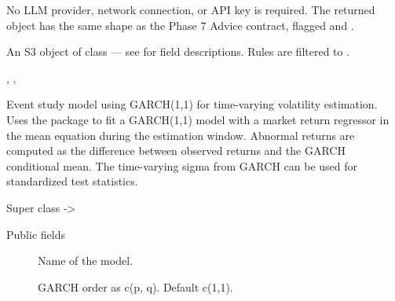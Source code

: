 \documentclass[a4paper]{book}
\begin{document}
%
\begin{Details}
No LLM provider, network connection, or API key is required. The returned
 object has the same shape as the Phase 7 Advice contract,
flagged  and .
\end{Details}
%
\begin{Value}
An S3 object of class  — see 
for field descriptions. Rules are filtered to .
\end{Value}
%
\begin{SeeAlso}
, ,
\end{SeeAlso}
%
\begin{Examples}
\end{Examples}
%
\begin{Description}
Event study model using GARCH(1,1) for time-varying volatility estimation.
Uses the  package to fit a GARCH(1,1) model with a market
return regressor in the mean equation during the estimation window.
Abnormal returns are computed as the difference between observed returns
and the GARCH conditional mean. The time-varying sigma from GARCH can
be used for standardized test statistics.
\end{Description}
%
\begin{Section}{Super class}
 -> 
\end{Section}
%
\begin{Section}{Public fields}

\begin{description}

\item[] Name of the model.

\item[] GARCH order as c(p, q). Default c(1,1).

\end{description}


\end{Section}
\end{document}
